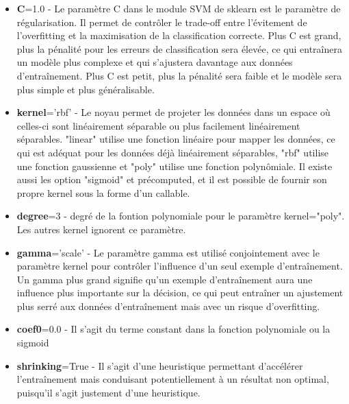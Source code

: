 \documentclass{ceri/sty/rapport}
\begin{document}
\begin{itemize}
    \item  \textbf{C}=1.0 - Le paramètre C dans le module SVM de sklearn est le paramètre de régularisation. Il permet de contrôler le trade-off entre l'évitement de l'overfitting et la maximisation de la classification correcte. Plus C est grand, plus la pénalité pour les erreurs de classification sera élevée, ce qui entraînera un modèle plus complexe et qui s'ajustera davantage aux données d'entraînement. Plus C est petit, plus la pénalité sera faible et le modèle sera plus simple et plus généralisable.\\
    
    \item  \textbf{kernel}='rbf' - Le noyau permet de projeter les données dans un espace où celles-ci sont linéairement séparable ou plus facilement linéairement séparables. "linear" utilise une fonction linéaire pour mapper les données, ce qui est adéquat pour les données déjà linéairement séparables, "rbf" utilise une fonction gaussienne et "poly" utilise une fonction polynômiale. Il existe aussi les option "sigmoid" et précomputed, et il est possible de fournir son propre kernel sous la forme d'un callable.\\
    
    \item  \textbf{degree}=3 - degré de la fontion polynomiale pour le paramètre kernel="poly". Les autres kernel ignorent ce paramètre.\\
    
    \item  \textbf{gamma}='scale' - Le paramètre gamma est utilisé conjointement avec le paramètre kernel pour contrôler l'influence d'un seul exemple d'entraînement. Un gamma plus grand signifie qu'un exemple d'entraînement aura une influence plus importante sur la décision, ce qui peut entraîner un ajustement plus serré aux données d'entraînement mais avec un risque d'overfitting.\\
    
    \item  \textbf{coef0}=0.0 - Il s'agit du terme constant dans la fonction polynomiale ou la sigmoid\\
    
    \item  \textbf{shrinking}=True - Il s'agit d'une heuristique permettant d'accélérer l'entraînement mais conduisant potentiellement à un résultat non optimal, puisqu'il s'agit justement d'une heuristique.\\
    

\end{itemize}
\end{document}
